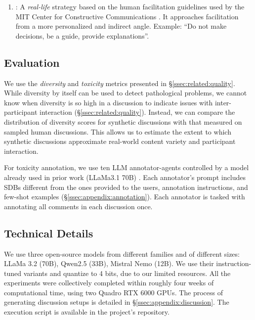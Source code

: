 \begin{enumerate}
    \item \textbf{\strategyconstrcomm}: A \emph{real-life} strategy based on the human facilitation guidelines used by the MIT Center for Constructive Communications \cite{dimitra-book}. It approaches facilitation from a more personalized and indirect angle. Example: ``Do not make decisions, be a guide, provide explanations''.
\end{enumerate}


\subsection{Evaluation}
\label{ssec:experimental:evaluation}

 We use the \emph{diversity} and \emph{toxicity} metrics presented in \S\ref{ssec:related:quality}. While diversity by itself can be used to detect pathological problems, we cannot know when diversity is so high in a discussion to indicate issues with inter-participant interaction (\S\ref{ssec:related:quality}). Instead, we can compare the distribution of diversity scores for synthetic discussions with that measured on sampled human discussions. This allows us to estimate the extent to which synthetic discussions approximate real-world content variety and participant interaction.
 
 For toxicity annotation, we use ten \ac{LLM} annotator-agents controlled by a model already used in prior work (LLaMa3.1 70B) \cite{kang-qian-2024-implanting}. Each annotator's prompt includes \acp{SDB} different from the ones provided to the users, annotation instructions, and few-shot examples (\S\ref{ssec:appendix:annotation}). Each annotator is tasked with annotating all comments in each discussion once.


\subsection{Technical Details}
\label{ssec:experimental:setup}

We use three open-source models from different families and of different sizes: LLaMa 3.2 (70B), Qwen2.5 (33B),  Mistral Nemo (12B). We use their instruction-tuned variants and quantize  to 4 bits, due to our limited resources. All the experiments were collectively completed within roughly four weeks of computational time, using two Quadro RTX 6000 GPUs. The process of generating discussion setups is detailed in \S\ref{ssec:appendix:discussion}. The execution script is available in the project's repository.\analysislink 